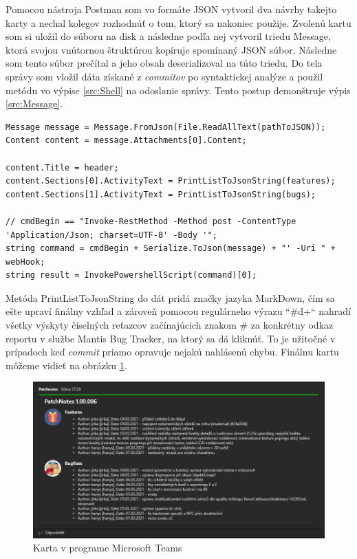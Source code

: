 \documentclass[slovak,bachelorpractice]{diploma}
\begin{document}
Pomocou nástroja Postman som vo formáte JSON vytvoril dva návrhy takejto karty a nechal kolegov rozhodnúť o tom, ktorý sa nakoniec použije. Zvolenú kartu som si uložil do súboru na disk a následne podľa nej vytvoril triedu Message, ktorá svojou vnútornou štruktúrou kopíruje spomínaný JSON súbor. Následne som tento súbor prečítal a jeho obsah deserializoval na túto triedu. Do tela správy som vložil dáta získané z \textit{commitov} po syntaktickej analýze a použil metódu vo výpise \ref{src:Shell} na odoslanie správy. Tento postup demonštruje výpis \ref{src:Message}. 
\vspace{10pt}
\begin{lstlisting}[label=src:Message,caption={Vytvorenie a odoslanie správy do služby Microsoft Teams}]
Message message = Message.FromJson(File.ReadAllText(pathToJSON));
Content content = message.Attachments[0].Content;

content.Title = header;
content.Sections[0].ActivityText = PrintListToJsonString(features);
content.Sections[1].ActivityText = PrintListToJsonString(bugs);

// cmdBegin == "Invoke-RestMethod -Method post -ContentType 'Application/Json; charset=UTF-8' -Body '";
string command = cmdBegin + Serialize.ToJson(message) + "' -Uri " + webHook;
string result = InvokePowershellScript(command)[0];
\end{lstlisting}

Metóda PrintListToJsonString do dát pridá značky jazyka MarkDown, čím sa ešte upraví finálny vzhľad a zároveň pomocou regulárneho výrazu \mbox{``\#\\d+``} nahradí všetky výskyty číselných reťazcov začínajúcich znakom \# za konkrétny odkaz reportu v službe Mantis Bug Tracker, na ktorý sa dá kliknúť. To je užitočné v prípadoch keď \textit{commit} priamo opravuje nejakú nahlásenú chybu. Finálnu kartu môžeme vidieť na obrázku \ref{pic:Logger}.

\begin{figure}[!htbp]
	\centering
	\includegraphics[width=1\textwidth]{Pictures/gitlogger.png}
	\caption{Karta v programe Microsoft Teams}
	\label{pic:Logger}
\end{figure}
\end{document}
